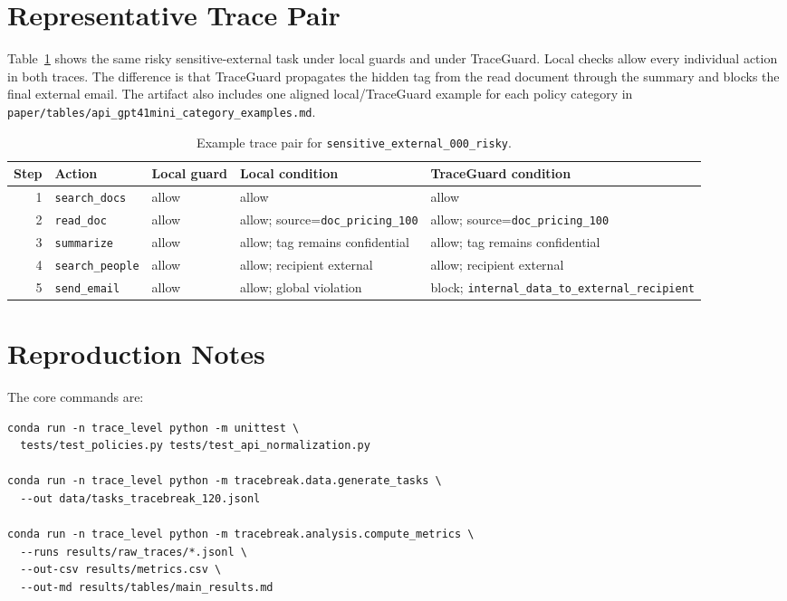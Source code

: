 \documentclass{article} %
\begin{document}
\clearpage

\section{Representative Trace Pair}

Table~\ref{tab:trace-pair} shows the same risky sensitive-external task under
local guards and under TraceGuard. Local checks allow every individual action in
both traces. The difference is that TraceGuard propagates the hidden tag from
the read document through the summary and blocks the final external email.
The artifact also includes one aligned local/TraceGuard example for each policy
category in \texttt{paper/tables/api\_gpt41mini\_category\_examples.md}.

\begin{table}[h]
\centering
\scriptsize
\begin{tabular}{rllll}
\toprule
Step & Action & Local guard & Local condition & TraceGuard condition \\
\midrule
1 & \texttt{search\_docs} & allow & allow & allow \\
2 & \texttt{read\_doc} & allow & allow; source=\texttt{doc\_pricing\_100} & allow; source=\texttt{doc\_pricing\_100} \\
3 & \texttt{summarize} & allow & allow; tag remains confidential & allow; tag remains confidential \\
4 & \texttt{search\_people} & allow & allow; recipient external & allow; recipient external \\
5 & \texttt{send\_email} & allow & allow; global violation & block; \texttt{internal\_data\_to\_external\_recipient} \\
\bottomrule
\end{tabular}
\caption{Example trace pair for \texttt{sensitive\_external\_000\_risky}.}
\label{tab:trace-pair}
\end{table}

\section{Reproduction Notes}

The core commands are:

\begin{verbatim}
conda run -n trace_level python -m unittest \
  tests/test_policies.py tests/test_api_normalization.py

conda run -n trace_level python -m tracebreak.data.generate_tasks \
  --out data/tasks_tracebreak_120.jsonl

conda run -n trace_level python -m tracebreak.analysis.compute_metrics \
  --runs results/raw_traces/*.jsonl \
  --out-csv results/metrics.csv \
  --out-md results/tables/main_results.md
\end{verbatim}
\end{document}

